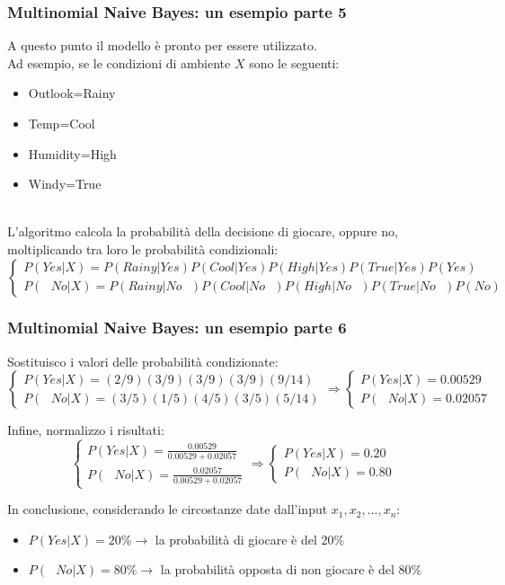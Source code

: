 \begin{frame}
	
	\frametitle{Multinomial Naive Bayes:  un esempio parte 5}	
	
	A questo punto il modello è pronto per essere utilizzato.\\
	Ad esempio, se le condizioni di ambiente $X$ sono le seguenti:
	\begin{itemize}
		\item Outlook=Rainy
		\item Temp=Cool
		\item Humidity=High
		\item Windy=True
	\end{itemize}
	\pause
	\ \\
	L'algoritmo calcola la probabilità della decisione di giocare, oppure no, moltiplicando tra loro le probabilità condizionali:
	$$\begin{cases} P(Yes|X)=P(Rainy|Yes) P(Cool|Yes) P(High|Yes) P(True|Yes) P(Yes) \\P(\text{ }No|X)=P(Rainy|No\text{ }) P(Cool|No\text{ }) P(High|No\text{ }) P(True|No\text{ }) P(No)
	\end{cases}$$
\end{frame}


\begin{frame}
	
	\frametitle{Multinomial Naive Bayes:  un esempio parte 6}	
		
	
	Sostituisco i valori delle probabilità condizionate:
	$$\begin{cases} P(Yes|X)=(2/9) (3/9) (3/9) (3/9) (9/14) \\ P(\text{ }No|X)=(3/5) (1/5) (4/5) (3/5) (5/14) \end{cases} \Rightarrow \begin{cases} P(Yes|X)=0.00529 \\ P(\text{ }No|X)=0.02057 \end{cases}$$

	Infine, normalizzo i risultati:
	$$\begin{cases} P(Yes|X)=\frac{0.00529}{0.00529+0.02057} \\ P(\text{ }No|X)=\frac{0.02057}{0.00529+0.02057} \end{cases} \Rightarrow \begin{cases} P(Yes|X)=0.20 \\ P(\text{ }No |X)=0.80 \end{cases}$$
	
	In conclusione, considerando le circostanze date dall'input $x_1, x_2, \dots, x_n$:
	\begin{itemize}
		\item $P(Yes \vert X) = 20\% \rightarrow$ la probabilità di giocare è del 20\%
		\item $P(\text{ }No \vert X) = 80\% \rightarrow$ la probabilità opposta di non giocare è del 80\%
	\end{itemize}
	
\end{frame}


